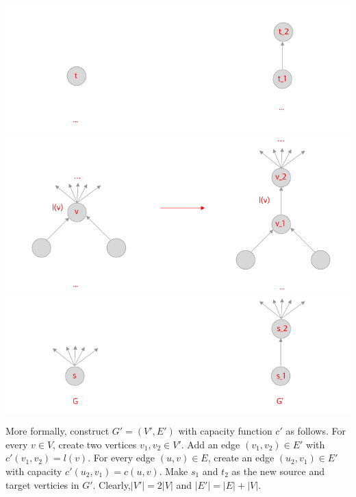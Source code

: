 \documentclass[12pt]{article}
\begin{document}
\begin{enumerate}[1.]
\begin{enumerate}[a)]
        \begin{center}
        \includegraphics[width=\linewidth]{images/worksheet_5_solution_29.png}
        \includegraphics[width=\linewidth]{images/worksheet_5_solution_30.png}
        \includegraphics[width=\linewidth]{images/worksheet_5_solution_31.png}
        \end{center}

        \bigskip

        More formally, construct $G' = (V', E')$ with capacity function $c'$ as follows.
        For every $v \in V$, create two vertices $v_1, v_2 \in V'$. Add an edge $(v_1, v_2) \in E'$
        with $c'(v_1, v_2) = l(v)$. For every edge $(u,v) \in E$, create an edge $(u_2, v_1) \in E'$
        with capacity $c'(u_2, v_1) = c(u,v)$. Make $s_1$ and $t_2$ as the new source and target verticies
        in $G'$. Clearly,$\lvert V' \rvert = 2 \lvert V \rvert$ and $\lvert E' \rvert = \lvert E \rvert + \lvert V \rvert$.

        \bigskip


\end{enumerate}
\end{enumerate}
\end{document}
